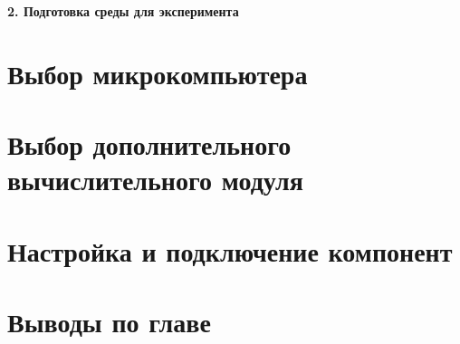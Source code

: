 \newpage
\begin{center}
  \textbf{\large 2. Подготовка среды для эксперимента }
\end{center}

\section{Выбор микрокомпьютера}

\section{Выбор дополнительного вычислительного модуля}

\section{Настройка и подключение компонент}

\section{Выводы по главе}